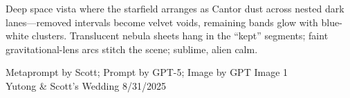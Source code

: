 \documentclass[12pt]{article}
\begin{document}
\noindent
\begin{adjustbox}{max size={\textwidth}{\textheight}}
\begin{varwidth}{\textwidth}
\RaggedRight
\footnotesize
Deep space vista where the starfield arranges as Cantor dust across nested dark lanes—removed intervals become velvet voids, remaining bands glow with blue-white clusters. Translucent nebula sheets hang in the “kept” segments; faint gravitational-lens arcs stitch the scene; sublime, alien calm.
\end{varwidth}
\end{adjustbox}
\vfill
{\raggedleft\footnotesize
Metaprompt by Scott; Prompt by GPT-5; Image by GPT Image 1 \\
Yutong \& Scott's Wedding 8/31/2025\par}
\end{document}
